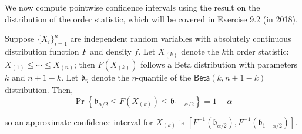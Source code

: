 \documentclass[]{book}
\theoremstyle{definition}
\theoremstyle{definition}
\theoremstyle{definition}
\theoremstyle{remark}
\begin{document}
We now compute pointwise confidence intervals using the result on the
distribution of the order statistic, which will be covered in Exercise
9.2 (in 2018).

Suppose \(\{X_i\}_{i=1}^n\) are independent random variables with
absolutely continuous distribution function \(F\) and density \(f\). Let
\(X_{(k)}\) denote the \(k\)th order statistic:
\(X_{(1)} \leq \cdots \leq X_{(n)}\); then \(F(X_{(k)})\) follows a Beta
distribution with parameters \(k\) and \(n + 1 - k\). Let
\(\mathfrak{b}_{\eta}\) denote the \(\eta\)-quantile of the
\(\mathsf{Beta}(k, n+1-k)\) distribution. Then,
\[\Pr\left\{\mathfrak{b}_{\alpha/2} \leq  F(X_{(k)}) \leq \mathfrak{b}_{1-\alpha/2}\right\} = 1-\alpha\]

so an approximate confidence interval for \(X_{(k)}\) is
\([F^{-1}(\mathfrak{b}_{\alpha/2}), F^{-1}(\mathfrak{b}_{1-\alpha/2})]\).
\end{document}

